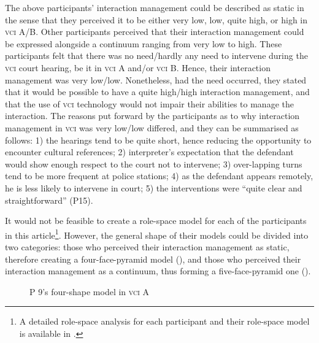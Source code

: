 \documentclass[output=paper]{langsci/langscibook}
\begin{document}
The above participants’ interaction management could be described as static in the sense that they perceived it to be either very low, low, quite high, or high in \textsc{vci} A/B. Other participants perceived that their interaction management could be expressed alongside a continuum ranging from very low to high. These participants felt that there was no need/hardly any need to intervene during the \textsc{vci} court hearing, be it in \textsc{vci} A and/or \textsc{vci} B. Hence, their interaction management was very low/low. Nonetheless, had the need occurred, they stated that it would be possible to have a quite high/high interaction management, and that the use of \textsc{vci} technology would not impair their abilities to manage the interaction. The reasons put forward by the participants as to why interaction management in \textsc{vci} was very low/low differed, and they can be summarised as follows: 1) the hearings tend to be quite short, hence reducing the opportunity to encounter cultural references; 2) interpreter’s expectation that the defendant would show enough respect to the court not to intervene; 3) over-lapping turns tend to be more frequent at police stations; 4) as the defendant appears remotely, he is less likely to intervene in court; 5) the interventions were “quite clear and straightforward” (P15).

It would not be feasible to create a role-space model for each of the participants in this article\footnote{A detailed role-space analysis for each participant and their role-space model is available in \citet{Devaux2017b}.}. However, the general shape of their models could be divided into two categories: those who perceived their interaction management as static, therefore creating a four-face-pyramid model (), and those who perceived their interaction management as a continuum, thus forming a five-face-pyramid one ().  

  

 

\begin{figure}
\caption{P 9's four-shape model in \textsc{vci} A\label{fig:devaux:3}}
\end{figure}
\end{document}
